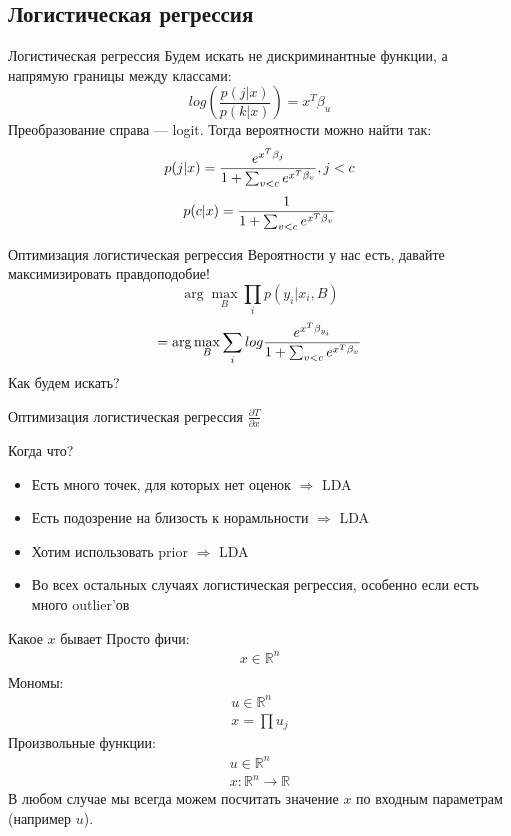 \documentclass[14pt, fleqn, xcolor={dvipsnames, table}]{beamer}
\begin{document}
\subsection{Логистическая регрессия}

\begin{frame}{Логистическая регрессия}
Будем искать не дискриминантные функции, а напрямую границы между классами:
$$
log\left(\frac{p(j|x)}{p(k|x)}\right) = x^T \beta_{u}
$$
Преобразование справа --- logit. Тогда вероятности можно найти так:
$$
p(j|x) = {e^{x^T \beta_{j}} \over 1 + \sum_{v < c} e^{x^T\beta_v}}, j < c
$$
$$
p(c|x) = {1 \over 1 + \sum_{v < c} e^{x^T\beta_v}}
$$
\end{frame}

\begin{frame}{Оптимизация логистическая регрессия}
Вероятности у нас есть, давайте максимизировать правдоподобие!
$$
\arg \max_B \prod_i p(y_i|x_i, B)
$$
$$
= \arg \max_B \sum_i log {e^{x^T \beta_{y_i}} \over 1 + \sum_{v < c} e^{x^T\beta_v}}
$$
Как будем искать?
\end{frame}

\begin{frame}{Оптимизация логистическая регрессия}
$\frac{\partial T}{\partial x}$
\end{frame}

\begin{frame}{Когда что?}
\begin{itemize}
  \item Есть много точек, для которых нет оценок $\Rightarrow$ LDA
  \item Есть подозрение на близость к норамльности $\Rightarrow$ LDA
  \item Хотим использовать prior $\Rightarrow$ LDA
  \item Во всех остальных случаях логистическая регрессия, особенно если есть много outlier'ов
\end{itemize}
\end{frame}

\begin{frame}{Какое $x$ бывает}
Просто фичи:
$$\begin{array}{l}
x \in \mathbb{R}^n \\
\end{array}$$
Мономы:
$$\begin{array}{l}
u \in \mathbb{R}^n \\
x = \prod u_j
\end{array}$$
Произвольные функции:
$$\begin{array}{l}
u \in \mathbb{R}^n \\
x: \mathbb{R}^n \to \mathbb{R}
\end{array}$$
В любом случае мы всегда можем посчитать значение $x$ по входным параметрам (например $u$).
\end{frame}
\end{document}
